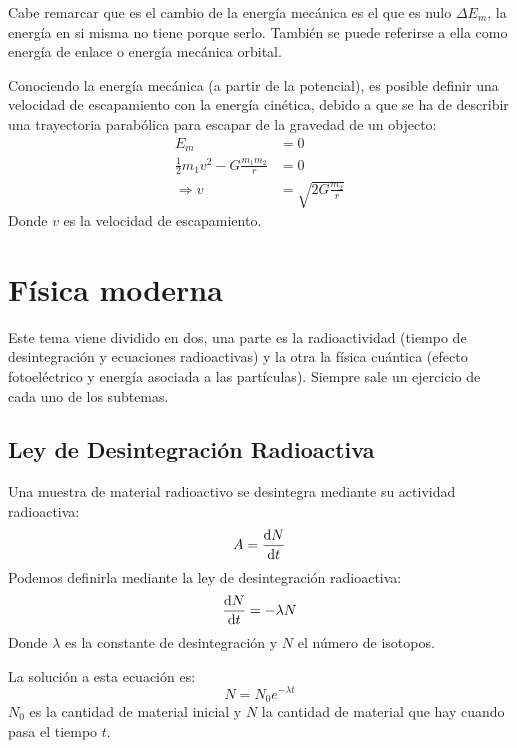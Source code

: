\documentclass[arial,a4paper,print]{article}
\begin{document}
Cabe remarcar que es el cambio de la energía mecánica es el que es nulo $\Delta E_{m}$, la energía en si misma no tiene porque serlo. También se puede referirse a ella como energía de enlace o energía mecánica orbital.

Conociendo la energía mecánica (a partir de la potencial), es posible definir una velocidad de escapamiento con la energía cinética, debido a que se ha de describir una trayectoria parabólica para escapar de la gravedad de un objecto:
\begin{align*}
	E_{m} &= 0 \\
	\frac12m_{1}v^2 - G\frac{m_{1}m_{2}}{r} &= 0  \\
	\Rightarrow v &= \sqrt{2G\frac{m_{2}}{r}}
\end{align*}
Donde $ v$ es la velocidad de escapamiento.

\section{Física moderna}
Este tema viene dividido en dos, una parte es la radioactividad (tiempo de desintegración y ecuaciones radioactivas) y la otra la física cuántica (efecto fotoeléctrico y energía asociada a las partículas). Siempre sale un ejercicio de cada uno de los subtemas.

\subsection{Ley de Desintegración Radioactiva}
Una muestra de material radioactivo se desintegra mediante su actividad radioactiva:
\begin{equation*}
	A = \dv{N}{t}
\end{equation*}
Podemos definirla mediante la ley de desintegración radioactiva:
\begin{equation*}
	\dv{N}{t} = -\lambda N
\end{equation*}
Donde $\lambda$ es la constante de desintegración y $N$ el número de isotopos.

La solución a esta ecuación es:
\begin{equation*}
	N = N_{0}e^{-\lambda t}
\end{equation*}
$N_{0}$ es la cantidad de material inicial y $N$ la cantidad de material que hay cuando pasa el tiempo $t$.
\end{document}
